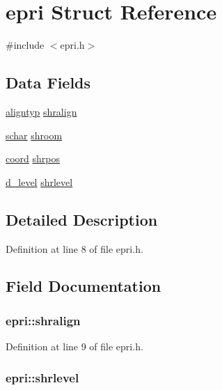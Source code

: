 \hypertarget{structepri}{\section{epri Struct Reference}
\label{structepri}
}


{\ttfamily \#include $<$epri.\+h$>$}

\subsection*{Data Fields}
\begin{DoxyCompactItemize}
\item 
\hyperlink{align_8h_a3e17b7a656899892e425fc89481aa2ab}{aligntyp} \hyperlink{structepri_ac50b17e953df87e36f5697d8a656c6ae}{shralign}
\item 
\hyperlink{config_8h_a0fd9ce9d735064461bebfe6037026093}{schar} \hyperlink{structepri_ac9a10c59c4b320cd888d28b6c2f86409}{shroom}
\item 
\hyperlink{structcoord}{coord} \hyperlink{structepri_adb9efb6b7325d17c2f2403c8691259bf}{shrpos}
\item 
\hyperlink{structd__level}{d\+\_\+level} \hyperlink{structepri_aa9a63e0761f7478b1ff4f6dc9c2a24b9}{shrlevel}
\end{DoxyCompactItemize}


\subsection{Detailed Description}


Definition at line 8 of file epri.\+h.



\subsection{Field Documentation}
\hypertarget{structepri_ac50b17e953df87e36f5697d8a656c6ae}{
\subsubsection[{shralign}]{ epri\+::shralign}}\label{structepri_ac50b17e953df87e36f5697d8a656c6ae}


Definition at line 9 of file epri.\+h.

\hypertarget{structepri_aa9a63e0761f7478b1ff4f6dc9c2a24b9}{
\subsubsection[{shrlevel}]{ epri\+::shrlevel}}\label{structepri_aa9a63e0761f7478b1ff4f6dc9c2a24b9}


